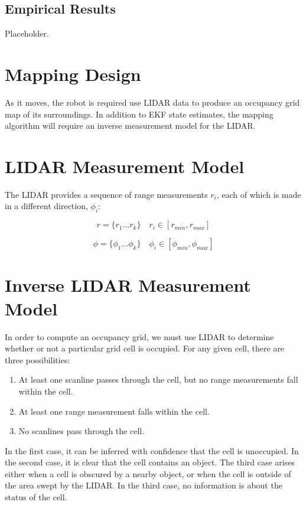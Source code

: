 \documentclass[11pt]{article} %
\begin{document}
\subsection{Empirical Results}

Placeholder.

\section{Mapping Design}
As it moves, the robot is required use LIDAR data to produce an occupancy grid map of its surroundings.  In addition to EKF state estimates, the mapping algorithm will require an inverse measurement model for the LIDAR.

\section{LIDAR Measurement Model}
The LIDAR provides a sequence of range measurements $r_i$, each of which is made in a different direction, $\phi_i$:

\begin{equation}
r = \{r_1 \dots r_k\} \quad r_i \in [r_{min}, r_{max}]
\end{equation}

\begin{equation}
\phi = \{\phi_1 \dots \phi_k\} \quad \phi_i \in [\phi_{min}, \phi_{max}]
\end{equation}

\section{Inverse LIDAR Measurement Model}
In order to compute an occupancy grid, we must use LIDAR to determine whether or not a particular grid cell is occupied.  For any given cell, there are three possibilities:

\begin{enumerate}
 \item At least one scanline passes through the cell, but no range measurements fall within the cell.
 \item At least one range measurement falls within the cell.
 \item No scanlines pass through the cell.
\end{enumerate}

In the first case, it can be inferred with confidence that the cell is unoccupied.  
In the second case, it is clear that the cell contains an object.  
The third case arises either when a cell is obscured by a nearby object, or when the cell is outside of the area swept by the LIDAR.  In the third case, no information is about the status of the cell.
\end{document}
